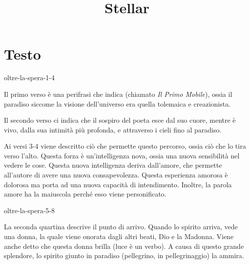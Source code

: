 \documentclass[preview]{standalone}
\begin{document}
\title{Stellar}
\genpage

\section{Testo}


\begin{snippet}{oltre-la-spera-1-4}

    Il primo verso è una perifrasi che indica  (chiamato \textit{Il Primo Mobile}), ossia il paradiso
    siccome la visione dell'universo era quella tolemaica e creazionista.
    
    Il secondo verso ci indica che il sospiro del poeta esce dal suo cuore, mentre è vivo, dalla sua intimità più profonda,
    e attraverso i cieli fino al paradiso.  
    
    Ai versi 3-4 viene descritto ciò che permette questo percorso, ossia ciò che lo tira
    verso l'alto. Questa forza è un'intelligenza nova, ossia una nuova sensibilità nel vedere le cose.
    Questa nuova intelligenza deriva dall'amore, che permette all'autore di avere una nuova consapevolezza.
    Questa esperienza amorosa è dolorosa ma porta ad una nuova capacità di intendimento.
    Inoltre, la parola amore ha la maiuscola perché esso viene personificato.
\end{snippet}

\begin{snippet}{oltre-la-spera-5-8}

    La seconda quartina descrive il punto di arrivo.
    Quando lo spirito arriva, vede una donna, la quale viene onorata dagli altri beati, Dio e la Madonna.
    Viene anche detto che questa donna brilla (luce è un verbo).
    A causa di questo grande splendore, lo spirito giunto in paradiso (pellegrino, in pellegrinaggio) la ammira.
\end{snippet}
\end{document}
